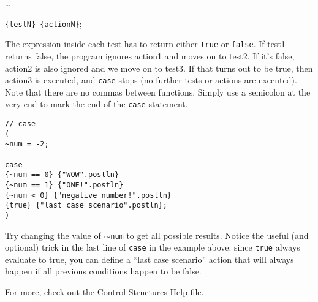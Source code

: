 \dots

\texttt{\{testN\} \{actionN\}};

The expression inside each test has to return either \texttt{true} or \texttt{false}. If test1 returns false, the program ignores action1 and moves on to test2. If it's false, action2 is also ignored and we move on to test3. If that turns out to be true, then action3 is executed, and \texttt{case} stops (no further tests or actions are executed). Note that there are no commas between functions. Simply use a semicolon at the very end to mark the end of the \texttt{case} statement.

 
\begin{lstlisting}[style=SuperCollider-IDE, basicstyle=\scttfamily\footnotesize]
// case
(
~num = -2;

case
{~num == 0} {"WOW".postln}
{~num == 1} {"ONE!".postln}
{~num < 0} {"negative number!".postln}
{true} {"last case scenario".postln};
)
\end{lstlisting}
 
Try changing the value of \texttt{$\sim$num} to get all possible results. Notice the useful (and optional) trick in the last line of \texttt{case} in the example above: since \texttt{true} always evaluate to true, you can define a ``last case scenario'' action that will always happen if all previous conditions happen to be false.

For more, check out the Control Structures Help file.